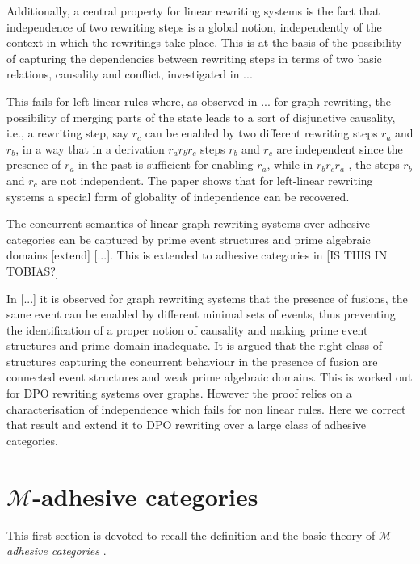 \documentclass[a4paper]{article}
\theoremstyle{definition}
\begin{document}
Additionally, a central property for linear rewriting systems is the fact that independence of two rewriting steps is a global notion, independently of the context in which the rewritings take place. This is at the basis of the possibility of capturing the dependencies between rewriting steps in terms of two basic relations, causality and conflict, investigated in ...

This fails for left-linear rules where, as observed in ... for graph rewriting, the possibility of merging parts of the state leads to a sort of disjunctive causality, i.e., a rewriting step, say $r_c$ can be enabled by two different rewriting steps $r_a$ and $r_b$, in a way that in a derivation $r_a r_b r_c$ steps $r_b$ and $r_c$ are independent since the presence of $r_a$ in the past is sufficient for enabling $r_a$, while in $r_b r_c r_a$ , the steps $r_b$ and $r_c$ are not independent. The paper shows that for left-linear rewriting systems a special form of globality of independence can be recovered.


The concurrent semantics of linear graph rewriting systems over adhesive categories can be captured by prime event structures and prime algebraic domains [extend] [...]. This is extended to adhesive categories in   [IS THIS IN TOBIAS?]

In [...] it is observed for graph rewriting systems that the presence of fusions, the same event can be enabled by different minimal sets of events, thus preventing the identification of a proper notion of causality and making prime event structures and prime domain inadequate. It is argued that the right class of structures capturing the concurrent behaviour in the presence of fusion are connected event structures and weak prime algebraic domains. This is worked out for DPO rewriting systems over graphs. However the proof relies on a characterisation of independence which fails for non linear rules. Here we correct that result and extend it to DPO rewriting over a large class of adhesive categories.

\section{$\mathcal{M}$-adhesive categories}

This first section is devoted to recall the definition and the basic theory of \emph{$\mathcal{M}$-adhesive categories} \cite{azzi2019essence,ehrig2012,ehrig2014adhesive,lack2005adhesive}. 
\end{document}
